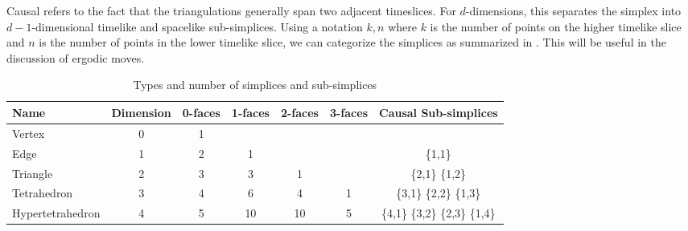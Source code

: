 \documentclass[12pt]{article}
\begin{document}
Causal refers to the fact that the triangulations generally span two adjacent timeslices. For $d$-dimensions, this separates the simplex into $d-1$-dimensional timelike and spacelike sub-simplices. Using a notation ${k,n}$ where $k$ is the number of points on the higher timelike slice and $n$ is the number of points in the lower timelike slice, we can categorize the simplices as summarized in . This will be useful in the discussion of ergodic moves.

\begin{table}
\centering
\begin{tabular}{|l|c|c|c|c|c|c|}
\hline
Name & Dimension & 0-faces & 1-faces & 2-faces & 3-faces & Causal Sub-simplices \\
\hline
\hline
Vertex & 0 & 1 & & & & \\
Edge & 1 & 2 & 1 & & & \{1,1\} \\
Triangle & 2 & 3 & 3 & 1 & & \{2,1\} \{1,2\}\\
Tetrahedron & 3 & 4 & 6 & 4 & 1 & \{3,1\} \{2,2\} \{1,3\} \\
Hypertetrahedron & 4 & 5 & 10 & 10 & 5 & \{4,1\} \{3,2\} \{2,3\} \{1,4\} \\
\hline
\end{tabular}
\caption[Simplex types]{Types and number of simplices and sub-simplices}
\label{table:simplices}
\end{table}



\end{document}
